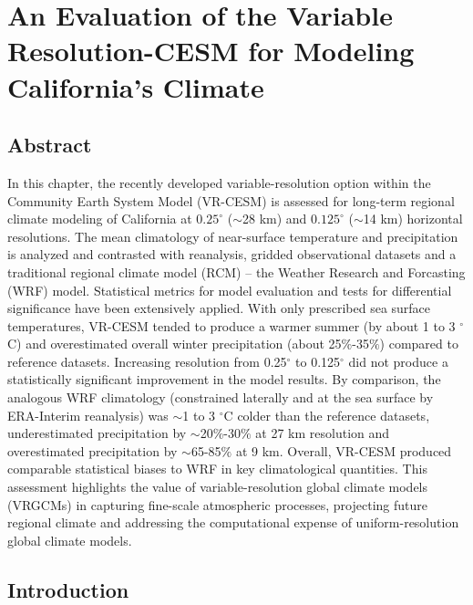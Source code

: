 \chapter{An Evaluation of the Variable Resolution-CESM for Modeling California's Climate}
%

\section{Abstract}

In this chapter, the recently developed variable-resolution option within the Community Earth System Model (VR-CESM) is assessed for long-term regional climate modeling of California at $0.25^\circ$ ($\sim$28 km) and $0.125^\circ$ ($\sim$14 km) horizontal resolutions. The mean climatology of near-surface temperature and precipitation is analyzed and contrasted with reanalysis, gridded observational datasets and a traditional regional climate model (RCM) -- the Weather Research and Forcasting (WRF) model. Statistical metrics for model evaluation and tests for differential significance have been extensively applied. With only prescribed sea surface temperatures, VR-CESM tended to produce a warmer summer (by about 1 to 3 $^\circ$C) and overestimated overall winter precipitation (about 25$\%$-35$\%$) compared to reference datasets. Increasing resolution from 0.25$^\circ$ to 0.125$^\circ$ did not produce a statistically significant improvement in the model results. By comparison, the analogous WRF climatology (constrained laterally and at the sea surface by ERA-Interim reanalysis) was $\sim$1 to 3 $^\circ$C colder than the reference datasets, underestimated precipitation by $\sim$20$\%$-30$\%$ at 27 km resolution and overestimated precipitation by $\sim$65-85$\%$ at 9 km.  Overall, VR-CESM produced comparable statistical biases to WRF in key climatological quantities.  This assessment highlights the value of variable-resolution global climate models (VRGCMs) in capturing fine-scale atmospheric processes, projecting future regional climate and addressing the computational expense of uniform-resolution global climate models.


\section{Introduction}

